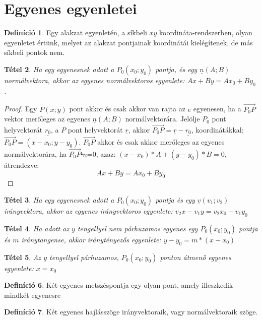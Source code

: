 \documentclass[twoside,12pt]{report}
\renewcommand{\vec}{\underline}
\newtheorem{theorem}{Tétel}[section]
\theoremstyle{definition}
\newtheorem{definition}[theorem]{Definíció}
\begin{document}
\section{Egyenes egyenletei}
	\begin{definition}
		Egy alakzat egyenletén, a síkbeli $xy$ koordináta-rendszerben, olyan egyenletet értünk,
		melyet az alakzat pontjainak koordinátái kielégítenek, de más síkbeli pontok nem.
	\end{definition}
	\begin{theorem}
		Ha egy egyenesnek adott a $P_0(x_0;y_0)$ pontja, és egy $\vec{n}(A;B)$ normálvektora, akkor az egyenes normálvektoros egyenlete: $Ax+By=Ax_0+By_0$.
	\end{theorem}
	\begin{proof}
		Egy $P(x;y)$ pont akkor és csak akkor van rajta az $e$ egyenesen, ha a $\overrightarrow{P_0P}$ vektor merőleges az egyenes $\vec{n}(A;B)$ normálvektorára. Jelölje $P_0$ pont helyvektorát $\vec{r_0}$, a $P$ pont helyvektorát $\vec{r}$, akkor $\overrightarrow{P_0P}=\vec{r}-\vec{r_0}$, koordinátákkal: $\overrightarrow{P_0P}=(x-x_0;y-y_0)$. $\overrightarrow{P_0P}$ akkor és csak akkor merőleges az egyenes normálvektorára, ha $\overrightarrow{P_0P}\centerdot\vec{n}$=0, azaz: $(x-x_0)*A+(y-y_0)*B=0$, átrendezve:
		\begin{equation*}
			Ax+By=Ax_0+By_0
		\end{equation*}
	\end{proof}
	\begin{theorem}
		Ha egy egyenesnek adott a $P_0(x_0;y_0)$ pontja és egy $\vec{v}(v_1;v_2)$ irányvektora, akkor az egyenes irányvektoros egyenlete: $v_2x-v_1y=v_2x_0-v_1y_0$
	\end{theorem}
	\begin{theorem}
		Ha adott az $y$ tengellyel nem párhuzamos egyenes egy $P_0(x_0;y_0)$ pontja és $m$ iránytangense, akkor iránytényezős egyenlete: $y-y_0=m*(x-x_0)$
	\end{theorem}
	\begin{theorem}
		Az $y$ tengellyel párhuzamos, $P_0(x_0;y_0)$ ponton átmenő egyenes egyenlete: $x=x_0$
	\end{theorem}
	\begin{definition}
		Két egyenes metszéspontja egy olyan pont, amely illeszkedik mindkét egyenesre
	\end{definition}
	\begin{definition}
		Két egyenes hajlásszöge irányvektoraik, vagy normálvektoraik szöge.
	\end{definition}
\end{document}

